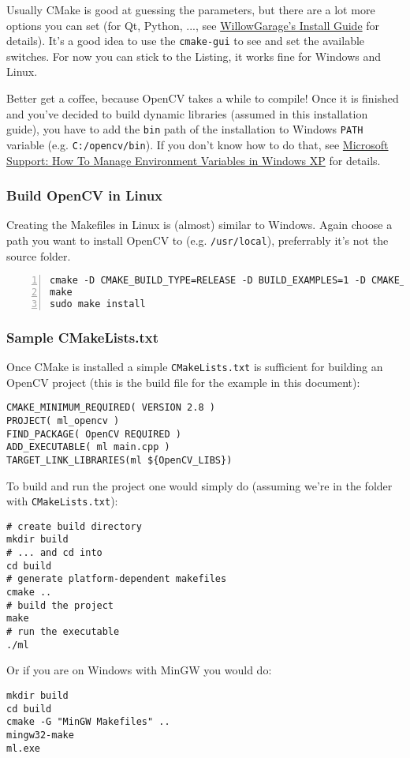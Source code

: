 Usually CMake is good at guessing the parameters, but there are a lot more options you can set (for Qt, Python, ..., see \href{http://opencv.willowgarage.com/wiki/InstallGuide}{WillowGarage's Install Guide} for details). It's a good idea to use the \lstinline|cmake-gui| to see and set the available switches. For now you can stick to the Listing, it works fine for Windows and Linux.

Better get a coffee, because OpenCV takes a while to compile! Once it is finished and you've decided to build dynamic libraries (assumed in this installation guide), you have to add the \lstinline|bin| path of the installation to Windows \lstinline|PATH| variable (e.g. \lstinline|C:/opencv/bin|). If you don't know how to do that, see \href{http://support.microsoft.com/kb/310519}{Microsoft Support: How To Manage Environment Variables in Windows XP} for details.

\subsubsection*{Build OpenCV in Linux}
Creating the Makefiles in Linux is (almost) similar to Windows. Again choose a path you want to install OpenCV to (e.g. \lstinline|/usr/local|), preferrably it's not the source folder.

\begin{lstlisting}[numberstyle=\footnotesize, numbers=left]
cmake -D CMAKE_BUILD_TYPE=RELEASE -D BUILD_EXAMPLES=1 -D CMAKE_INSTALL_PREFIX=/usr/local ..
make 
sudo make install
\end{lstlisting}

\subsubsection*{Sample CMakeLists.txt}
Once CMake is installed a simple \lstinline|CMakeLists.txt| is sufficient for building an OpenCV project (this is the build file for the example in this document):

\lstset{
	language=cmake,
}
\begin{lstlisting}
CMAKE_MINIMUM_REQUIRED( VERSION 2.8 )
PROJECT( ml_opencv )
FIND_PACKAGE( OpenCV REQUIRED )
ADD_EXECUTABLE( ml main.cpp )
TARGET_LINK_LIBRARIES(ml ${OpenCV_LIBS})
\end{lstlisting}

To build and run the project one would simply do (assuming we're in the folder with \lstinline|CMakeLists.txt|):

\lstset{
	language=sh,
}
\begin{lstlisting}
# create build directory 
mkdir build
# ... and cd into
cd build
# generate platform-dependent makefiles
cmake ..
# build the project
make
# run the executable
./ml
\end{lstlisting}

Or if you are on Windows with MinGW you would do:

\begin{lstlisting}
mkdir build
cd build
cmake -G "MinGW Makefiles" ..
mingw32-make
ml.exe
\end{lstlisting}
